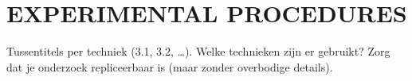 \section{EXPERIMENTAL PROCEDURES}
Tussentitels per techniek (3.1, 3.2, \dots).
Welke technieken zijn er gebruikt?
Zorg dat je onderzoek repliceerbaar is (maar zonder overbodige details).
